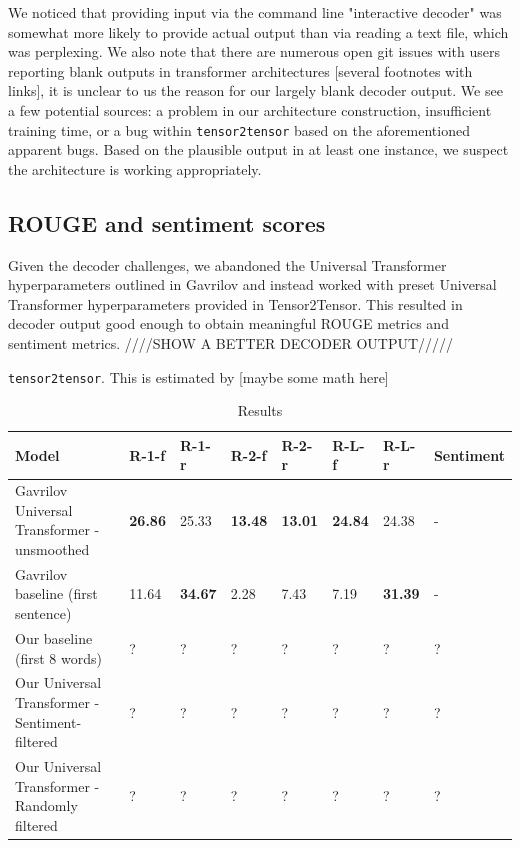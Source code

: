 \documentclass[11pt]{article}
\begin{document}
We noticed that providing input via the command line "interactive decoder" was somewhat more likely to provide actual output than via reading a text file, which was perplexing. We also note that there are numerous open git issues with users reporting blank outputs in transformer architectures [several footnotes with links], it is unclear to us the reason for our largely blank decoder output. We see a few potential sources: a problem in our architecture construction, insufficient training time, or a bug within \texttt{tensor2tensor} based on the aforementioned apparent bugs. Based on the plausible output in at least one instance, we suspect the architecture is working appropriately.

\subsection{ROUGE and sentiment scores}
Given the decoder challenges, we abandoned the Universal Transformer hyperparameters outlined in Gavrilov and instead worked with preset Universal Transformer hyperparameters provided in Tensor2Tensor. This resulted in decoder output good enough to obtain meaningful ROUGE metrics and sentiment metrics. 
////SHOW A BETTER DECODER OUTPUT/////

 \texttt{tensor2tensor}. This is estimated by [maybe some math here]

\begin{table}[h!]
\centering
\begin{small}
\begin{tabular}{|p{7cm}|p{.8cm}|p{.8cm}|p{.8cm}|p{.8cm}|p{.8cm}|p{.8cm}|p{1.3cm}|}
 \hline
 Model & R-1-f & R-1-r & R-2-f & R-2-r & R-L-f & R-L-r & Sentiment \\
 \hline
 Gavrilov Universal Transformer - unsmoothed & \textbf{26.86} & 25.33 & \textbf{13.48} & \textbf{13.01} & \textbf{24.84} & 24.38 & - \\ [0.5ex] 
 Gavrilov baseline (first sentence) & 11.64 & \textbf{34.67} & 2.28 & 7.43 & 7.19 & \textbf{31.39} & - \\ 
 Our baseline (first 8 words) & ? & ? & ? & ? & ? & ? & ? \\
 Our Universal Transformer - Sentiment-filtered & ? & ? & ? & ? & ? & ? & ? \\
 Our Universal Transformer - Randomly filtered & ? & ? & ? & ? & ? & ? & ? \\ [1ex]
 \hline
\end{tabular}
\end{small}
\caption{Results}
\label{table:4}
\end{table}
\end{document}

